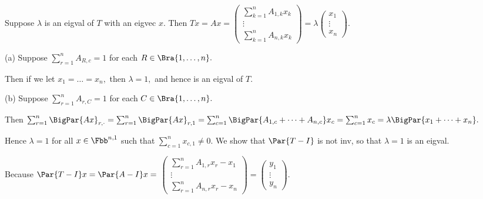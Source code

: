 \vspace{-8pt}\par\quad
Suppose $\lambda$ is an eigval of $T$ with an eigvec $x.$ Then $Tx=Ax={}${\normalsize$\begin{pmatrix} \sum_{k=1}^n A_{1,k}x_k\\ \vdots\\ \sum_{k=1}^n A_{n,k}x_k\end{pmatrix}$}${}=\lambda ${\normalsize$\begin{pmatrix} x_1\\ \vdots\\ x_n\end{pmatrix}$}.\vspace{-6pt}\par\quad
(a) Suppose $\sum_{r=1}^n A_{R,c}=1$ for each $R\in\Bra{1,\dots,n}.$\par\quad\Ha
Then if we let $x_1=\dots=x_n,$ then $\lambda=1,$ and hence is an eigval of $T.$\par\vspace{10pt}\quad
(b) Suppose $\sum_{r=1}^n A_{r,C}=1$ for each $C\in\Bra{1,\dots,n}.$\vspace{4pt}\par\quad\Hb
Then $\sum_{r=1}^n \BigPar{Ax}_{r,\cdot}=\sum_{r=1}^n \BigPar{Ax}_{r,1}=\sum_{c=1}^n\BigPar{A_{1,c}+\dots+A_{n,c}}x_c=\sum_{c=1}^n x_c=\lambda\BigPar{x_1+\dots+x_n}.$\vspace{4pt}\par\quad\Hb
Hence $\lambda=1$ for all $x\in\Fbb^{n,1}$ such that $\sum_{c=1}^n x_{c,1}\neq 0.$\PfEnd\vspace{10pt}\quad\Hb
\Or We show that $\Par{T-I}$ is not inv, so that $\lambda=1$ is an eigval.\vspace{2pt}\par\quad\Hb
Because $\Par{T-I}x=\Par{A-I}x={}${\small$\begin{pmatrix} \sum_{r=1}^n A_{1,r}x_r-x_1\\ \vdots\\ \sum_{r=1}^n A_{n,r}x_r-x_n\end{pmatrix}=\begin{pmatrix} y_1\\ \vdots\\ y_n\end{pmatrix}$}.\vspace{4pt}\par\quad\Hb
